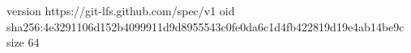 version https://git-lfs.github.com/spec/v1
oid sha256:4e3291106d152b4099911d9d8955543c0fe0da6c1d4fb422819d19e4ab14be9c
size 64
